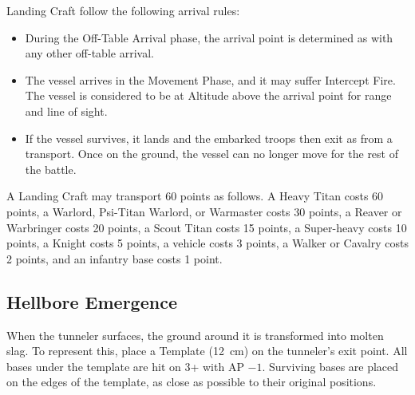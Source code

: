 Landing Craft follow the following arrival rules:

\begin{itemize}
    \item During the Off-Table Arrival phase, the arrival point is determined as with any other off-table arrival.
    \item The vessel arrives in the Movement Phase, and it may suffer Intercept Fire. The vessel is considered to be at Altitude above the arrival point for range and line of sight.
    \item If the vessel survives, it lands and the embarked troops then exit as from a transport. Once on the ground, the vessel can no longer move for the rest of the battle.
\end{itemize}

A Landing Craft may transport 60 points as follows. A Heavy Titan costs 60 points, a Warlord, Psi-Titan Warlord, or Warmaster costs 30 points, a Reaver or Warbringer costs 20 points, a Scout Titan costs 15 points, a Super-heavy costs 10 points, a Knight costs 5 points, a vehicle costs 3 points, a Walker or Cavalry costs 2 points, and an infantry base costs 1 point.

\subsection{Hellbore Emergence}

When the tunneler surfaces, the ground around it is transformed into molten slag. To represent this, place a Template (12~cm) on the tunneler's exit point. All bases under the template are hit on 3+ with AP $-1$. Surviving bases are placed on the edges of the template, as close as possible to their original positions.
